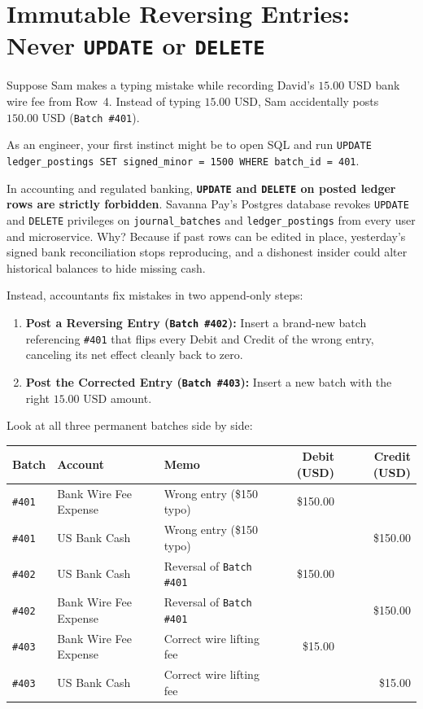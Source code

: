 \section{Immutable Reversing Entries: Never \texttt{UPDATE} or \texttt{DELETE}}

Suppose Sam makes a typing mistake while recording David's $15.00\text{ USD}$ bank wire fee from Row~4. Instead of typing $15.00\text{ USD}$, Sam accidentally posts $150.00\text{ USD}$ (\texttt{Batch \#401}).

As an engineer, your first instinct might be to open SQL and run \texttt{UPDATE ledger\_postings SET signed\_minor = 1500 WHERE batch\_id = 401}.

In accounting and regulated banking, \textbf{\texttt{UPDATE} and \texttt{DELETE} on posted ledger rows are strictly forbidden}. Savanna Pay's Postgres database revokes \texttt{UPDATE} and \texttt{DELETE} privileges on \texttt{journal\_batches} and \texttt{ledger\_postings} from every user and microservice. Why? Because if past rows can be edited in place, yesterday's signed bank reconciliation stops reproducing, and a dishonest insider could alter historical balances to hide missing cash.

Instead, accountants fix mistakes in two append-only steps:
\begin{enumerate}
  \item \textbf{Post a Reversing Entry (\texttt{Batch \#402}):} Insert a brand-new batch referencing \texttt{\#401} that flips every Debit and Credit of the wrong entry, canceling its net effect cleanly back to zero.
  \item \textbf{Post the Corrected Entry (\texttt{Batch \#403}):} Insert a new batch with the right $15.00\text{ USD}$ amount.
\end{enumerate}

Look at all three permanent batches side by side:

\begin{center}
\small
\begin{tabular}{lllrr}
\toprule
\textbf{Batch} & \textbf{Account} & \textbf{Memo} & \textbf{Debit (USD)} & \textbf{Credit (USD)} \\
\midrule
\texttt{\#401} & Bank Wire Fee Expense & Wrong entry (\$150 typo) & \$150.00 & \\
\texttt{\#401} & US Bank Cash & Wrong entry (\$150 typo) & & \$150.00 \\
\midrule
\texttt{\#402} & US Bank Cash & Reversal of \texttt{Batch \#401} & \$150.00 & \\
\texttt{\#402} & Bank Wire Fee Expense & Reversal of \texttt{Batch \#401} & & \$150.00 \\
\midrule
\texttt{\#403} & Bank Wire Fee Expense & Correct wire lifting fee & \$15.00 & \\
\texttt{\#403} & US Bank Cash & Correct wire lifting fee & & \$15.00 \\
\bottomrule
\end{tabular}
\end{center}

